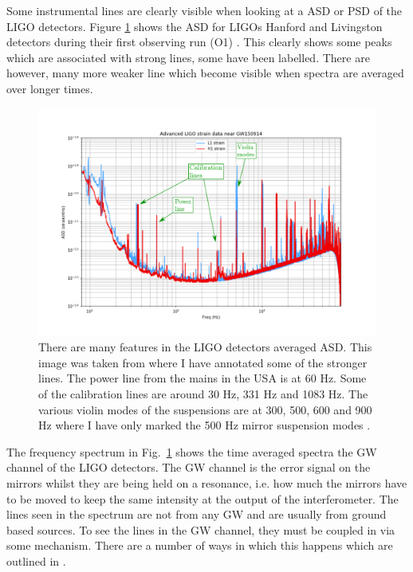 Some instrumental lines are clearly visible when looking at a \gls{ASD} or \gls{PSD} of the \gls{LIGO} detectors. Figure \ref{detchar:line:psd} shows the \gls{ASD} for \glspl{LIGO} Hanford and Livingston detectors during their first observing run (O1) \citep{GWOpen}. This clearly shows some peaks which are associated with strong lines, some have been labelled. There are however, many more weaker line which become visible when spectra are averaged over longer times.
%
\begin{figure}
    \centering
    \includegraphics[width=\textwidth]{C5_detchar/ligo_o1_asd_annot.pdf}
    \caption[Strain \gls{ASD} for the \gls{LIGO} detectors.]{There are many features in the \gls{LIGO} detectors averaged \gls{ASD}. This image was taken from \citep{GWOpen} where I have annotated some of the stronger lines. The power line from the mains in the USA is at 60 Hz. Some of the calibration lines are around 30 Hz, 331 Hz and 1083 Hz. The various violin modes of the suspensions are at 300, 500, 600 and 900 Hz where I have only marked the 500 Hz mirror suspension modes \citep{GWOpen}.}
    \label{detchar:line:psd}
\end{figure}
%
The frequency spectrum in Fig.~\ref{detchar:line:psd} shows the time averaged spectra the \gls{GW} channel of the \gls{LIGO} detectors. 
The \gls{GW} channel is the error signal on the mirrors whilst they are being held on a resonance, i.e. how much the mirrors have to be moved to keep the same intensity at the output of the interferometer.
The lines seen in the spectrum are not from any \gls{GW} and are usually from ground based sources.
To see the lines in the \gls{GW} channel, they must be coupled in via some mechanism. 
There are a number of ways in which this happens which are outlined in \citep{covas2018IdentificationMitigation}.
